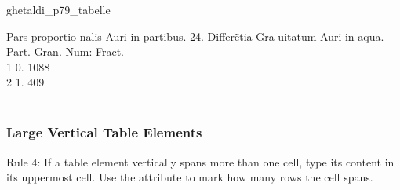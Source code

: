 \begin{sampleImage}{ghetaldi_p79_tabelle}
\begin{typeLatin}
Pars proportio  nalis Auri in  partibus. 24. \lwr{} Differ\~etia Gra uitatum Auri  in aqua. \\
Part.  Gran.  Num: Fract. \\
1  0.  1088 \\
2  1.  409 \\
\someText \\
\end{typeLatin}

\end{sampleImage}


\subsubsection{Large Vertical Table Elements}
\label{section large vertical table elements}

\begin{mainrule}
Rule 4: If a table element vertically spans more than one cell, type its content in its uppermost cell. Use the attribute  to mark how many rows the cell spans.
\end{mainrule}

